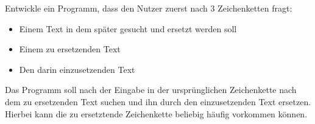 
Entwickle ein Programm, dass den Nutzer zuerst nach 3 Zeichenketten
fragt:

\begin{itemize}
	\item Einem Text in dem später gesucht und ersetzt werden soll
	\item Einem zu ersetzenden Text
	\item Den darin einzusetzenden Text
\end{itemize}

Das Programm soll nach der Eingabe in der ursprünglichen Zeichenkette nach dem zu ersetzenden Text suchen 
und ihn durch den einzusetzenden Text ersetzen. Hierbei kann die zu ersetztende Zeichenkette beliebig häufig
vorkommen können.